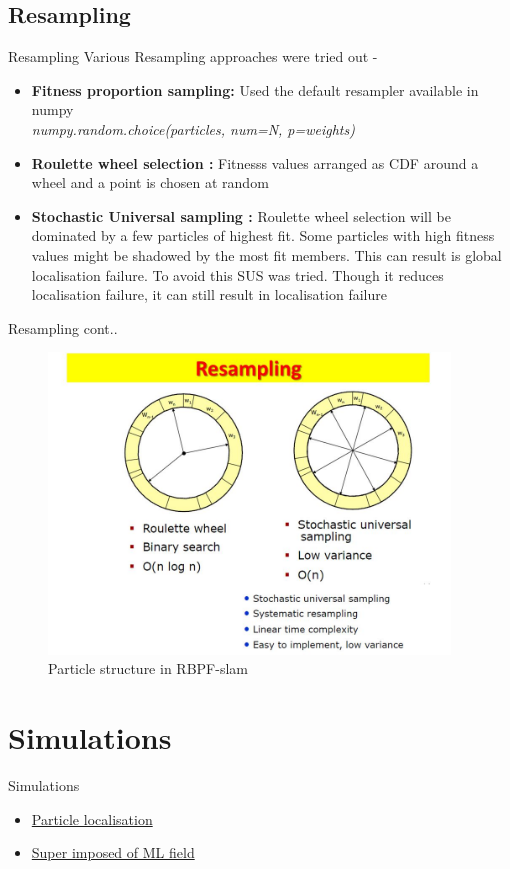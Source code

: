 \documentclass{beamer}
\begin{document}
\subsection{Resampling}
\begin{frame}{Resampling}
    Various Resampling approaches were tried out -
    \begin{itemize}
        \item \textbf{Fitness proportion sampling:} Used the default resampler available in numpy \\
            \textit{numpy.random.choice(particles, num=N, p=weights)}
        \item \textbf{Roulette wheel selection :} Fitnesss values arranged as CDF around a wheel and a point is chosen at random
        \item \textbf{Stochastic Universal sampling :} Roulette wheel selection will be dominated by a few particles of highest fit. Some particles with high fitness values might be shadowed by the most fit members. This can result is global localisation failure. To avoid this SUS was tried. Though it reduces localisation failure, it can still result in localisation failure  
    \end{itemize}
\end{frame}

\begin{frame}{Resampling cont..}
    \begin{figure}
        \includegraphics[height = 80mm]{./rl_multi.jpg}
        \caption{Particle structure in RBPF-slam}
    \end{figure}
\end{frame}


\section{Simulations}
\begin{frame}{Simulations}

    \begin{itemize}
        \item \href{https://github.com/aswinpajayan/seminar-related/blob/master/gifs/MCL-final.gif}{Particle localisation}
        \item \href{https://github.com/aswinpajayan/seminar-related/blob/master/gifs/sensorScans.gif}{Super imposed of ML field}
    \end{itemize}
\end{frame}
\end{document}
